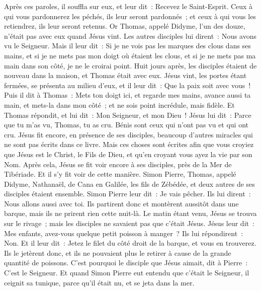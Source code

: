 \begin{multicols}{2}
Après ces paroles, il souffla sur eux, et leur dit~: Recevez le Saint-Esprit.
Ceux à qui vous pardonnerez les péchés, ils leur seront pardonnés~; et ceux à qui vous les retiendrez, ils leur seront retenus.
Or Thomas, appelé Didyme, l'un des douze, n'était pas avec eux quand Jésus vint.
Les autres disciples lui dirent~: Nous avons vu le Seigneur. Mais il leur dit~: Si je ne vois pas les marques des clous dans ses mains, et si je ne mets pas mon doigt où étaient les clous, et si je ne mets pas ma main dans son côté, je ne le croirai point.
Huit jours après, les disciples étaient de nouveau dans la maison, et Thomas était avec eux. Jésus vint, les portes étant fermées, se présenta au milieu d'eux, et il leur dit~: Que la paix soit avec vous~!
Puis il dit à Thomas~: Mets ton doigt ici, et regarde mes mains, avance aussi ta main, et mets-la dans mon côté~; et ne sois point incrédule, mais fidèle.
Et Thomas répondit, et lui dit~: Mon Seigneur, et mon Dieu~!
Jésus lui dit~: Parce que tu m'as vu, Thomas, tu as cru. Bénis sont ceux qui n'ont pas vu et qui ont cru.
Jésus fit encore, en présence de ses disciples, beaucoup d'autres miracles qui ne sont pas écrits dans ce livre.
Mais ces choses sont écrites afin que vous croyiez que Jésus est le Christ, le Fils de Dieu, et qu'en croyant vous ayez la vie par son Nom.
\VerseOne{}Après cela, Jésus se fit voir encore à ses disciples, près de la Mer de Tibériade. Et il s'y fit voir de cette manière.
Simon Pierre, Thomas, appelé Didyme, Nathanaël, de Cana en Galilée, les fils de Zébédée, et deux autres de ses disciples étaient ensemble.
Simon Pierre leur dit~: Je vais pêcher. Ils lui dirent~: Nous allons aussi avec toi. Ils partirent donc et montèrent aussitôt dans une barque, mais ils ne prirent rien cette nuit-là.
Le matin étant venu, Jésus se trouva sur le rivage~; mais les disciples ne savaient pas que c'était Jésus.
Jésus leur dit~: Mes enfants, avez-vous quelque petit poisson à manger~? Ils lui répondirent~: Non.
Et il leur dit~: Jetez le filet du côté droit de la barque, et vous en trouverez. Ils le jetèrent donc, et ils ne pouvaient plus le retirer à cause de la grande quantité de poissons.
C'est pourquoi le disciple que Jésus aimait, dit à Pierre~: C'est le Seigneur. Et quand Simon Pierre eut entendu que c'était le Seigneur, il ceignit sa tunique, parce qu'il était nu, et se jeta dans la mer.

\end{multicols}
